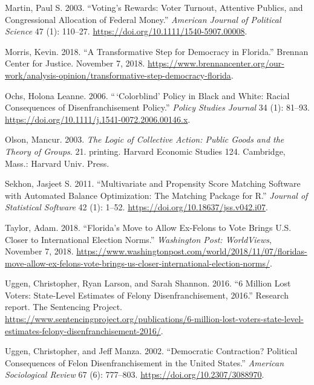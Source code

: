 \documentclass[
  12pt,
]{article}
\newlength{\cslhangindent}
\newenvironment{cslreferences}%
  {\setlength{\parindent}{0pt}%
  \everypar{\setlength{\hangindent}{\cslhangindent}}\ignorespaces}%
  {\par}
\begin{document}
\begin{cslreferences}
\leavevmode\hypertarget{ref-Martin2003}{}%
Martin, Paul S. 2003. ``Voting's Rewards: Voter Turnout, Attentive Publics, and Congressional Allocation of Federal Money.'' \emph{American Journal of Political Science} 47 (1): 110--27. \url{https://doi.org/10.1111/1540-5907.00008}.

\leavevmode\hypertarget{ref-Morris2018}{}%
Morris, Kevin. 2018. ``A Transformative Step for Democracy in Florida.'' Brennan Center for Justice. November 7, 2018. \url{https://www.brennancenter.org/our-work/analysis-opinion/transformative-step-democracy-florida}.

\leavevmode\hypertarget{ref-Ochs2006}{}%
Ochs, Holona Leanne. 2006. ``\,`Colorblind' Policy in Black and White: Racial Consequences of Disenfranchisement Policy.'' \emph{Policy Studies Journal} 34 (1): 81--93. \url{https://doi.org/10.1111/j.1541-0072.2006.00146.x}.

\leavevmode\hypertarget{ref-Olson2003}{}%
Olson, Mancur. 2003. \emph{The Logic of Collective Action: Public Goods and the Theory of Groups}. 21. printing. Harvard Economic Studies 124. Cambridge, Mass.: Harvard Univ. Press.

\leavevmode\hypertarget{ref-Sekhon2011}{}%
Sekhon, Jasjeet S. 2011. ``Multivariate and Propensity Score Matching Software with Automated Balance Optimization: The Matching Package for R.'' \emph{Journal of Statistical Software} 42 (1): 1--52. \url{https://doi.org/10.18637/jss.v042.i07}.

\leavevmode\hypertarget{ref-Taylor2018}{}%
Taylor, Adam. 2018. ``Florida's Move to Allow Ex-Felons to Vote Brings U.S. Closer to International Election Norms.'' \emph{Washington Post: WorldViews}, November 7, 2018. \url{https://www.washingtonpost.com/world/2018/11/07/floridas-move-allow-ex-felons-vote-brings-us-closer-international-election-norms/}.

\leavevmode\hypertarget{ref-sentencing_2016}{}%
Uggen, Christopher, Ryan Larson, and Sarah Shannon. 2016. ``6 Million Lost Voters: State-Level Estimates of Felony Disenfranchisement, 2016.'' Research report. The Sentencing Project. \url{https://www.sentencingproject.org/publications/6-million-lost-voters-state-level-estimates-felony-disenfranchisement-2016/}.

\leavevmode\hypertarget{ref-Uggen2002}{}%
Uggen, Christopher, and Jeff Manza. 2002. ``Democratic Contraction? Political Consequences of Felon Disenfranchisement in the United States.'' \emph{American Sociological Review} 67 (6): 777--803. \url{https://doi.org/10.2307/3088970}.


\end{cslreferences}
\end{document}
